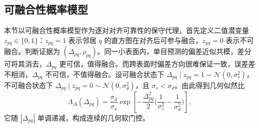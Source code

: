 \subsection{可融合性概率模型}
\label{sec:fusibility}

本节以可融合性概率模型作为逐对对齐可靠性的保守代理，首先定义二值潜变量 $z_{pq}\in\{0,1\}$：$z_{pq}=1$ 表示邻居 $q$ 的直方图在对齐后可参与融合，$z_{pq}=0$ 表示不可融合。判断证据为 $(\Delta_{pq},\rho_{pq})$。同一小表面内，单目预测的偏差近似共模，差分可将其消去，$\Delta_{pq}$ 更可信，值得融合。而跨表面时偏差方向很难保证一致，误差差不相消，$\Delta_{pq}$ 不可信，不值得融合。设可融合状态下 $\Delta_{pq}\mid z_{pq}=1\sim\mathcal{N}(0,\sigma_s^2)$，不可融合状态下 $\Delta_{pq}\mid z_{pq}=0\sim\mathcal{N}(0,\sigma_d^2)$，且 $\sigma_s<\sigma_d$。由此得到几何似然比
\begin{equation}
  \Lambda_{\Delta}(\Delta_{pq})
  =\frac{\sigma_d}{\sigma_s}
  \exp\!\left[-\frac{\Delta_{pq}^2}{2}\Big(\frac{1}{\sigma_s^2}-\frac{1}{\sigma_d^2}\Big)\right],
  \label{eq:lambda_delta}
\end{equation}
它随 $|\Delta_{pq}|$ 单调递减，构成连续的几何软门控。

